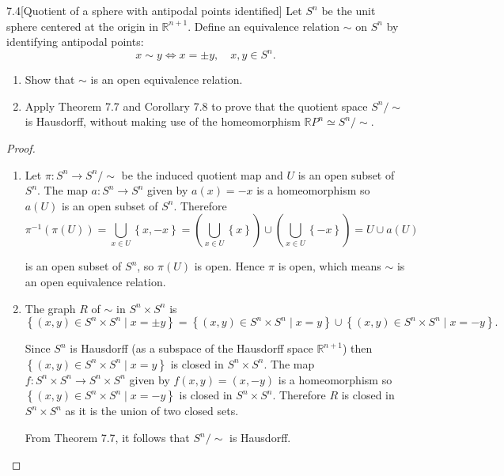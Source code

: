 \begin{problem}{7.4}[Quotient of a sphere with antipodal points identified]
Let \( S^{n} \) be the unit sphere centered at the origin in \( \mathbb{R}^{n+1} \). Define an equivalence relation \( \sim \) on \( S^{n} \) by identifying antipodal points:
\[
    x \sim y \Longleftrightarrow x = \pm y,\quad x, y\in S^{n}.
\]

\begin{enumerate}[label={(\alph*)},leftmargin=*]
    \item Show that \( \sim \) is an open equivalence relation.
    \item Apply Theorem 7.7 and Corollary 7.8 to prove that the quotient space \( S^{n}/\!\sim \) is Hausdorff, without making use of the homeomorphism \( \mathbb{R}P^{n} \simeq S^{n}/\!\sim \).
\end{enumerate}
\end{problem}

\begin{proof}
    \begin{enumerate}[label={(\alph*)},leftmargin=*]
        \item Let \( \pi: S^{n} \to S^{n}/\!\sim \) be the induced quotient map and \( U \) is an open subset of \( S^{n} \). The map \( a: S^{n} \to S^{n} \) given by \( a(x) = -x \) is a homeomorphism so \( a(U) \) is an open subset of \( S^{n} \). Therefore
              \[
                  \pi^{-1}(\pi(U)) = \bigcup_{x\in U} \left\{ x, -x \right\} = \left(\bigcup_{x\in U} \left\{ x \right\}\right) \cup \left( \bigcup_{x\in U} \left\{ -x \right\} \right) = U \cup a(U)
              \]

              is an open subset of \( S^{n} \), so \( \pi(U) \) is open. Hence \( \pi \) is open, which means \( \sim \) is an open equivalence relation.
        \item The graph \( R \) of \( \sim \) in \( S^{n} \times S^{n} \) is
              \[
                  \left\{ (x, y) \in S^{n}\times S^{n} \mid x = \pm y \right\} = \left\{ (x, y) \in S^{n}\times S^{n} \mid x = y \right\} \cup \left\{ (x, y) \in S^{n}\times S^{n} \mid x = -y \right\}.
              \]

              Since \( S^{n} \) is Hausdorff (as a subspace of the Hausdorff space \( \mathbb{R}^{n+1} \)) then \( \left\{ (x, y) \in S^{n}\times S^{n} \mid x = y \right\} \) is closed in \( S^{n} \times S^{n} \). The map \( f: S^{n} \times S^{n} \to S^{n} \times S^{n} \) given by \( f(x, y) = (x, -y) \) is a homeomorphism so \( \left\{ (x, y) \in S^{n}\times S^{n} \mid x = -y \right\} \) is closed in \( S^{n} \times S^{n} \). Therefore \( R \) is closed in \( S^{n} \times S^{n} \) as it is the union of two closed sets.

              From Theorem 7.7, it follows that \( S^{n}/\!\sim \) is Hausdorff.
    \end{enumerate}
\end{proof}

